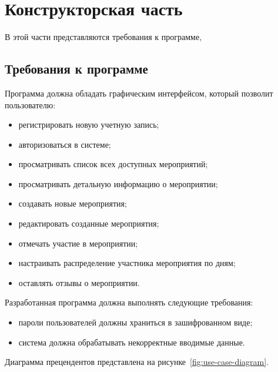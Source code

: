 \chapter{Конструкторская часть}

В этой части представляются требования к программе,

\section{Требования к программе}

Программа должна обладать графическим интерфейсом, который позволит пользователю:  

\begin{itemize}[label=--]
	\item регистрировать новую учетную запись;  
	\item авторизоваться в системе;  
	\item просматривать список всех доступных мероприятий;  
	\item просматривать детальную информацию о мероприятии;  
	\item создавать новые мероприятия;  
	\item редактировать созданные мероприятия;  
	\item отмечать участие в мероприятии;  
	\item настраивать распределение участника мероприятия по дням;  
	\item оставлять отзывы о мероприятии.  
\end{itemize}  

Разработанная программа должна выполнять следующие требования:  

\begin{itemize}[label=--]
	\item пароли пользователей должны храниться в зашифрованном виде;  
	\item система должна обрабатывать некорректные вводимые данные.
\end{itemize}  

\newpage

Диаграмма прецендентов представлена на рисунке~\ref{fig:use-case-diagram}.

